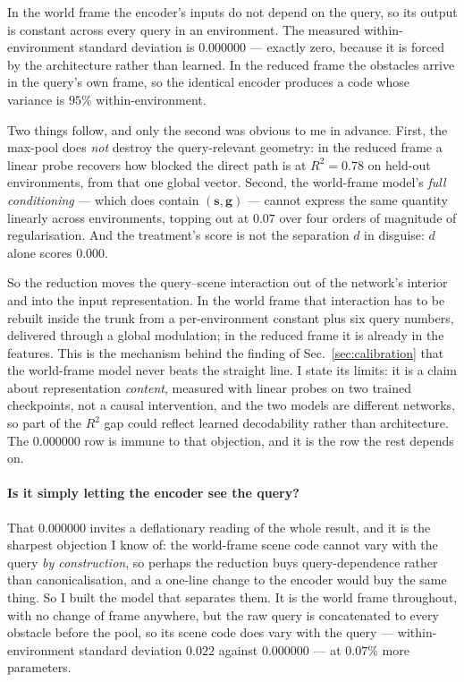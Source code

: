 \documentclass[11pt,a4paper]{article}
\newcommand{\svec}{\mathbf{s}}
\newcommand{\gvec}{\mathbf{g}}
\begin{document}
In the world frame the encoder's inputs do not depend on the query, so its output
is constant across every query in an environment. The measured within-environment
standard deviation is $0.000000$ --- exactly zero, because it is forced by the
architecture rather than learned. In the reduced frame the obstacles arrive in the
query's own frame, so the identical encoder produces a code whose variance is
$95\%$ within-environment.

Two things follow, and only the second was obvious to me in advance. First, the
max-pool does \emph{not} destroy the query-relevant geometry: in the reduced frame
a linear probe recovers how blocked the direct path is at $R^2 = 0.78$ on
held-out environments, from that one global vector. Second, the world-frame model's
\emph{full conditioning} --- which does contain $(\svec, \gvec)$ --- cannot
express the same quantity linearly across environments, topping out at $0.07$
over four orders of magnitude of regularisation. And the treatment's score is not
the separation $d$ in disguise: $d$ alone scores $0.000$.

So the reduction moves the query--scene interaction out of the network's interior
and into the input representation. In the world frame that interaction has to be
rebuilt inside the trunk from a per-environment constant plus six query numbers,
delivered through a global modulation; in the reduced frame it is already in the
features. This is the mechanism behind the finding of
Sec.~\ref{sec:calibration} that the world-frame model never beats the straight
line. I state its limits: it is a claim about representation \emph{content},
measured with linear probes on two trained checkpoints, not a causal
intervention, and the two models are different networks, so part of the $R^2$ gap
could reflect learned decodability rather than architecture. The
$0.000000$ row is immune to that objection, and it is the row the rest depends
on.

\paragraph{Is it simply letting the encoder see the query?} That $0.000000$
invites a deflationary reading of the whole result, and it is the sharpest
objection I know of: the world-frame scene code cannot vary with the query
\emph{by construction}, so perhaps the reduction buys query-dependence rather
than canonicalisation, and a one-line change to the encoder would buy the same
thing. So I built the model that separates them. It is the world frame throughout,
with no change of frame anywhere, but the raw query is concatenated to every
obstacle before the pool, so its scene code does vary with the query --- within-%
environment standard deviation $0.022$ against $0.000000$ --- at $0.07\%$ more
parameters.
\end{document}
